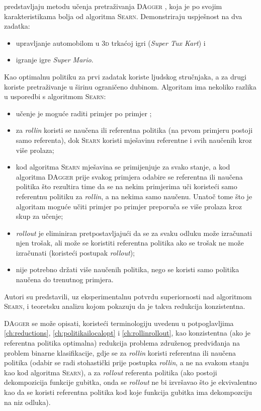 \citet{ross2011reduction} predstavljaju metodu učenja pretraživanja
\textsc{DAgger} , koja je po svojim
karakteristikama bolja od algoritma \textsc{Searn}. Demonstriraju uspješnost na
dva zadatka:
\begin{itemize}
  \item upravljanje automobilom u \textsc{3d} trkaćoj igri (\textit{Super Tux
  Kart}) i
  \item igranje igre \textit{Super Mario}.
\end{itemize}
Kao optimalnu politiku za prvi zadatak koriste ljudskog stručnjaka, a za drugi
koriste pretraživanje u širinu  ograničeno
dubinom. Algoritam ima nekoliko razlika u usporedbi s algoritmom \textsc{Searn}:
\begin{itemize}
  \item učenje je moguće raditi primjer po primjer ;
  \item za \textit{rollin} koristi se naučena ili referentna politika (na prvom
  primjeru postoji samo referenta), dok \textsc{Searn} koristi mješavinu
  referentne i svih naučenih kroz više prolaza;
  \item kod algoritma \textsc{Searn} mješavina se primijenjuje za svako stanje,
  a kod algoritma \textsc{DAgger} prije svakog primjera odabire se referentna
  ili naučena politika što rezultira time da se na nekim primjerima uči koristeći
  samo referentnu politiku za \textit{rollin}, a na nekima samo naučenu. Unatoč
  tome što je algoritam moguće učiti primjer po primjer preporuča se više
  prolaza kroz skup za učenje;
  \item \textit{rollout} je eliminiran pretpostavljajući da se za svaku odluku
  može izračunati njen trošak, ali može se koristiti referentna politika ako se
  trošak ne može izračunati (koristeći postupak \textit{rollout});
  \item nije potrebno držati više naučenih politika, nego se koristi samo politika
  naučena do trenutnog primjera.
\end{itemize}
Autori su predstavili, uz eksperimentalnu potvrdu superiornosti nad algoritmom
\textsc{Searn}, i teoretsku analizu kojom pokazuju da je takva redukcija
konzistentna.

\textsc{DAgger} se može opisati, koristeći terminologiju uvedenu u
potpoglavljima \ref{ch:reductions}, \ref{ch:politikailocalopt} i
\ref{ch:rollinrollout}, kao konzistentna (ako je referentna politika optimalna)
redukcija problema združenog predviđanja na problem binarne klasifikacije, gdje
se za \textit{rollin} koristi referentna ili naučena politika (odabir se radi
stohastički prije postupka \textit{rollin}, a ne na svakom stanju kao kod
algoritma \textsc{Searn}), a za \textit{rollout} referenta politika (ako postoji
dekompozicija funkcije gubitka, onda se \textit{rollout} ne bi izvršavao što je
ekvivalentno kao da se koristi referentna politika kod koje funkcija gubitka ima
dekompozciju na niz odluka).
